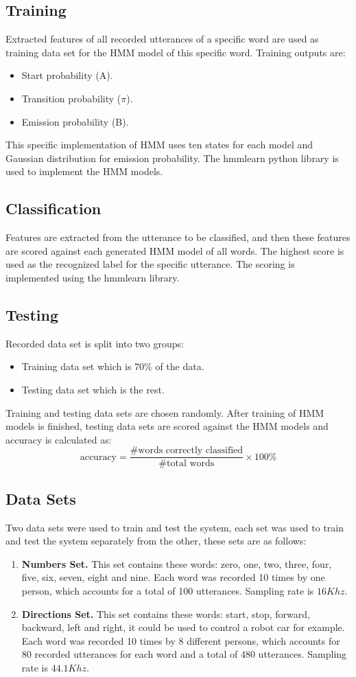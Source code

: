 \documentclass[12pt, a4paper, twoside]{report}
\begin{document}
\subsection{Training}
Extracted features of all recorded utterances of a specific word are used as training data set for the HMM model of this specific word. Training outputs are:
\begin{itemize}[noitemsep]
\item Start probability (A).
\item Transition probability ($\pi$).
\item Emission probability (B).
\end{itemize}
This specific implementation of HMM uses ten states for each model and Gaussian distribution for emission probability. The hmmlearn python library is used to implement the HMM models.
\subsection{Classification}
Features are extracted from the utterance to be classified, and then these features are scored against each generated HMM model of all words. The highest score is used as the recognized label for the specific utterance. The scoring is implemented using the hmmlearn library.
\subsection{Testing}
Recorded data set is split into two groups:
\begin{itemize}[noitemsep]
\item Training data set which is 70\% of the data.
\item Testing data set which is the rest.
\end{itemize}
Training and testing data sets are chosen randomly. After training of HMM models is finished, testing data sets are scored against the HMM models and accuracy is calculated as:
\begin{equation}
\text{accuracy} = \frac{\text{\# words correctly classified}}{\text{\# total words}} \times 100\%
\end{equation}

\subsection{Data Sets}
Two data sets were used to train and test the system, each set was used to train and test the system separately from the other, these sets are as follows:
\begin{enumerate}[noitemsep]
\item \textbf{Numbers Set.} This set contains these words: zero, one, two, three, four, five, six, seven, eight and nine. Each word was recorded 10 times by one person, which accounts for a total of 100 utterances. Sampling rate is $16Khz$.
\item \textbf{Directions Set.} This set contains these words: start, stop, forward, backward, left and right, it could be used to control a robot car for example. Each word was recorded 10 times by 8 different persons, which accounts for 80 recorded utterances for each word and a total of 480 utterances. Sampling rate is $44.1Khz$.
\end{enumerate}
\end{document}
